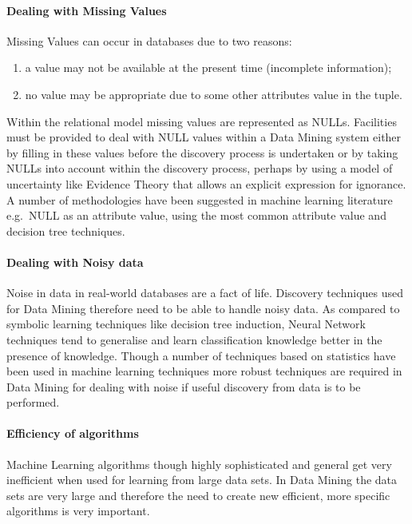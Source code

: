 \documentclass[a4paper,12pt,notitlepage,pdftex]{scrreprt}
\begin{document}
    \paragraph{Dealing with Missing Values}
        Missing Values can occur in databases due to two reasons:
        \begin{enumerate}
            \item a value may not be available at the present time (incomplete information);
            \item no value may be appropriate due to some other attributes value in the tuple.
        \end{enumerate}
        Within the relational model missing values are represented as NULLs.
        Facilities must be provided to deal with NULL values within a Data Mining system either by filling in these
        values before the discovery process is undertaken or by taking NULLs into account within the discovery
        process, perhaps by using a model of uncertainty like Evidence Theory that allows an explicit expression for
        ignorance.
        A number of methodologies have been suggested in machine learning literature e.g.\ NULL as an attribute value,
        using the most common attribute value and decision tree techniques.
    \paragraph{Dealing with Noisy data}
        Noise in data in real-world databases are a fact of life.
        Discovery techniques used for Data Mining therefore need to be able to handle noisy data.
        As compared to symbolic learning techniques like decision tree induction, Neural Network techniques tend to
        generalise and learn classification knowledge better in the presence of knowledge.
        Though a number of techniques based on statistics have been used in machine learning techniques more robust
        techniques are required in Data Mining for dealing with noise if useful discovery from data is to be
        performed.
    \paragraph{Efficiency of algorithms}
        Machine Learning algorithms though highly sophisticated and general get very inefficient when used for
        learning from large data sets.
        In Data Mining the data sets are very large and therefore the need to create new efficient, more specific
        algorithms is very important.
\end{document}
